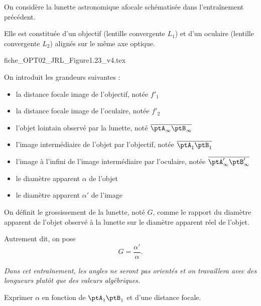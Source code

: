 On considère la lunette astronomique afocale schématisée dans l'entraînement précédent. 

Elle est constituée d'un objectif (lentille convergente $L_1$) et d'un oculaire (lentille convergente $L_2$) alignés sur le même axe optique. 

\begin{center}
{fiche_OPT02_JRL_Figure1.23_v4.tex}
\end{center}

On introduit les grandeurs suivantes :

\begin{itemize}
\item la distance focale image de l'objectif, notée $f'_1$
\item la distance focale image de l'oculaire, notée $f'_2$
\item l'objet lointain observé par la lunette, noté $\overline{\ptA_\infty\ptB_\infty}$
\item l'image intermédiaire de l'objet par l'objectif, notée $\overline{\ptA_1\ptB_1}$
\item l'image à l'infini de l'image intermédiaire par l'oculaire, notée $\overline{\ptA'_\infty\ptB'_\infty}$
\item le diamètre apparent $\alpha$ de l'objet
\item le diamètre apparent $\alpha'$ de l'image
\end{itemize}

On définit le grossissement de la lunette, noté $G$, comme le rapport du diamètre apparent de l'objet observé à la lunette sur le diamètre apparent réel de l'objet.

Autrement dit, on pose
\[
G = \frac{\alpha'}{\alpha}.
\]


{\itshape Dans cet entraînement, les angles ne seront pas orientés et on travaillera avec des longueurs plutôt que des valeurs algébriques.}


\medskip

\debutEntrainement


\begin{enonce}
Exprimer $\alpha$ en fonction de ${\ptA_1\ptB_1}$ et d'une distance focale. \minusBigskip

\end{enonce}

